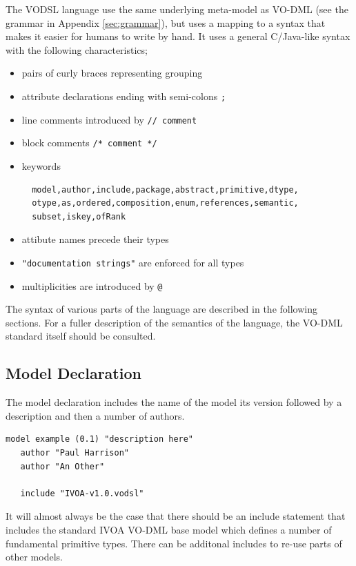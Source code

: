 \documentclass[11pt,a4paper]{ivoa}
\begin{document}
The VODSL language use the same underlying meta-model as VO-DML (see the grammar in Appendix \ref{sec:grammar}), but uses a mapping to a syntax that makes it easier
for humans to write by hand. It uses a general C/Java-like syntax with the following characteristics;

\begin{itemize}
  \item pairs of curly braces representing grouping
  \item attribute declarations ending with semi-colons \lstinline{;}
  \item line comments introduced by \lstinline{// comment}
  \item block comments \lstinline{/* comment */}
  \item keywords \begin{lstlisting}
  model,author,include,package,abstract,primitive,dtype,
  otype,as,ordered,composition,enum,references,semantic,
  subset,iskey,ofRank
  \end{lstlisting}
  \item attibute names precede their types
  \item \lstinline{"documentation strings"} are enforced for all types
  \item multiplicities are introduced by \lstinline{@}
\end{itemize}

The syntax of various parts of the language are described in the following sections. For a fuller description of the 
semantics of the language, the VO-DML standard itself should be consulted.


\subsection{Model Declaration}
The model declaration includes the name of the model its version followed by a description and then a number of authors.
\begin{lstlisting}[language=vodsl]
 model example (0.1) "description here" 
   author "Paul Harrison"
   author "An Other"
   
   include "IVOA-v1.0.vodsl"

\end{lstlisting}

It will almost always be the case that there should be an include statement that includes the standard IVOA VO-DML base model which defines a 
number of fundamental primitive types. There can be additonal includes to re-use parts of other models.
\end{document}
